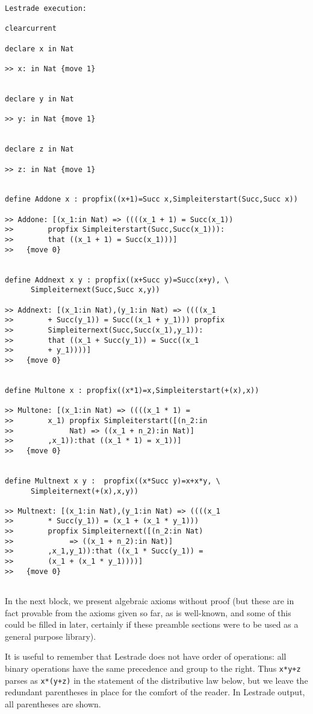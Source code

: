 \documentclass[12pt]{article}
\begin{document}
\begin{verbatim}Lestrade execution:

clearcurrent

declare x in Nat

>> x: in Nat {move 1}


declare y in Nat

>> y: in Nat {move 1}


declare z in Nat

>> z: in Nat {move 1}


define Addone x : propfix((x+1)=Succ x,Simpleiterstart(Succ,Succ x))

>> Addone: [(x_1:in Nat) => ((((x_1 + 1) = Succ(x_1)) 
>>        propfix Simpleiterstart(Succ,Succ(x_1))):
>>        that ((x_1 + 1) = Succ(x_1)))]
>>   {move 0}


define Addnext x y : propfix((x+Succ y)=Succ(x+y), \
      Simpleiternext(Succ,Succ x,y))

>> Addnext: [(x_1:in Nat),(y_1:in Nat) => ((((x_1 
>>        + Succ(y_1)) = Succ((x_1 + y_1))) propfix 
>>        Simpleiternext(Succ,Succ(x_1),y_1)):
>>        that ((x_1 + Succ(y_1)) = Succ((x_1 
>>        + y_1))))]
>>   {move 0}


define Multone x : propfix((x*1)=x,Simpleiterstart(+(x),x))

>> Multone: [(x_1:in Nat) => ((((x_1 * 1) = 
>>        x_1) propfix Simpleiterstart([(n_2:in 
>>             Nat) => ((x_1 + n_2):in Nat)]
>>        ,x_1)):that ((x_1 * 1) = x_1))]
>>   {move 0}


define Multnext x y :  propfix((x*Succ y)=x+x*y, \
      Simpleiternext(+(x),x,y))

>> Multnext: [(x_1:in Nat),(y_1:in Nat) => ((((x_1 
>>        * Succ(y_1)) = (x_1 + (x_1 * y_1))) 
>>        propfix Simpleiternext([(n_2:in Nat) 
>>             => ((x_1 + n_2):in Nat)]
>>        ,x_1,y_1)):that ((x_1 * Succ(y_1)) = 
>>        (x_1 + (x_1 * y_1))))]
>>   {move 0}


\end{verbatim}

In the next block, we present algebraic axioms without proof (but these are in fact provable from the axioms given so far, as is well-known, and some of this could be filled in later, certainly if these preamble sections were to be used as a general purpose library).

It is useful to remember that Lestrade does not have order of operations:  all binary operations have the same precedence and group to the right.  Thus
{\tt x*y+z} parses as {\tt x*(y+z)} in the statement of the distributive law below, but we leave the redundant parentheses in place for the comfort of the reader.  In Lestrade output, all parentheses are shown.
\end{document}

